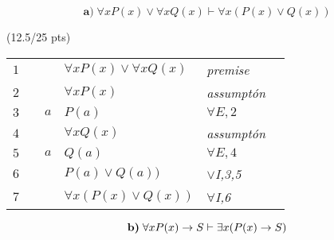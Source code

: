 \documentclass[a4paper,12pt]{article}
\begin{document}
\begin{equation*}
    \textbf{a)} \; \forall x P(x) \vee \forall x Q(x) \vdash \forall x (P(x) \vee Q(x)) 
\end{equation*}

\hfill \small{(12.5/25 pts)}\\
\begin{tcolorbox}
\begin{table}[H]
	\centering

	\begin{tabular}{*6{l}}
		$1$ & & & $\forall x P(x) \vee \forall x Q(x)$ & \textit{premise} &  \\\cline{2-6}
		
		$2$ & \multicolumn{1}{|c}{} &  &  $\forall x P(x)$ & \textit{assumptón} & \multicolumn{1}{c|}{} \\
		 
		$3$ & \multicolumn{1}{|c}{} & \textit{$a$}& $P(a)$ & \textit{$\forall E,2$} & \multicolumn{1}{c|}{} \\ \cline{2-6}
		
		$4$ & \multicolumn{1}{|c}{} &  &  $\forall x Q(x)$ & \textit{assumptón} & \multicolumn{1}{c|}{} \\
		
        $5$ & \multicolumn{1}{|c}{} & \textit{$a$}& $Q(a)$ & \textit{$\forall E,4$} & \multicolumn{1}{c|}{} \\ \cline{2-6}
		
		$6$ & & & $P(a) \vee Q(a)) $ & {\textit{$\vee$I,3,5}} & \\
		
		$7$ & & & $\forall x (P(x) \vee Q(x)) $ & {\textit{$\forall$I,6}} & \\ 
		
	\end{tabular}
\end{table}

\end{tcolorbox}

\begin{equation*}
    \textbf{b)} \; \forall x P(x) \rightarrow S \vdash \exists x (P(x)\rightarrow S)\\
\end{equation*}
\end{document}
